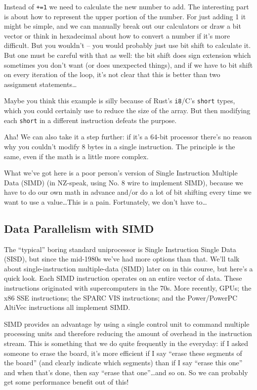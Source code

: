 Instead of \texttt{+=1} we need to calculate the new number to add. The interesting part is about how to represent the upper portion of the number. For just adding 1 it might be simple, and we can manually break out our calculators or draw a bit vector or think in hexadecimal about how to convert a number if it's more difficult. But you wouldn't -- you would probably just use bit shift to calculate it. But one must be careful with that as well: the bit shift does sign extension which sometimes you don't want (or does unexpected things), and if we have to bit shift on every iteration of the loop, it's not clear that this is better than two assignment statements\ldots

Maybe you think this example is silly because of Rust's \texttt{i8}/C's \texttt{short} types, which you could certainly use to reduce the size of the array. But then modifying each \texttt{short} in a different instruction defeats the purpose.

Aha! We can also take it a step further: if it's a 64-bit processor there's no reason why you couldn't modify 8 bytes in a single instruction. The principle is the same, even if the math is a little more complex.

What we've got here is a poor person's version of Single Instruction Multiple Data (SIMD) (in NZ-speak, using No. 8 wire to implement SIMD), because we have to do our own math in advance and/or do a lot of bit shifting every time we want to use a value\ldots This is a pain. Fortunately, we don't have to\ldots

\subsection*{Data Parallelism with SIMD}
The ``typical'' boring standard uniprocessor is Single Instruction Single Data (SISD), but since the mid-1980s we've had more options than that. We'll talk about single-instruction multiple-data (SIMD) later on in
this course, but here's a quick look. Each SIMD
instruction operates on an entire vector of data. These instructions
originated with supercomputers in the 70s. More recently, GPUs; the
x86 SSE instructions; the SPARC VIS instructions; and the
Power/PowerPC AltiVec instructions all implement SIMD.

SIMD provides an advantage by using a single control unit to command multiple processing units and therefore reducing the amount of overhead in the instruction stream. This is something that we do quite frequently in the everyday: if I asked someone to erase the board, it's more efficient if I say ``erase these segments of the board'' (and clearly indicate which segments) than if I say ``erase this one'' and when that's done, then say ``erase that one''\ldots and so on. So we can probably get some performance benefit out of this!

